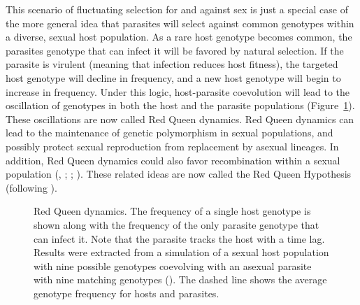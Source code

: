 \documentclass[
  letterpaper,
]{book}
\begin{document}
This scenario of fluctuating selection for and against sex is just a
special case of the more general idea that parasites will select against
common genotypes within a diverse, sexual host population. As a rare
host genotype becomes common, the parasites genotype that can infect it
will be favored by natural selection. If the parasite is virulent
(meaning that infection reduces host fitness), the targeted host
genotype will decline in frequency, and a new host genotype will begin
to increase in frequency. Under this logic, host-parasite coevolution
will lead to the oscillation of genotypes in both the host and the
parasite populations (Figure~\ref{fig-2-4}). These oscillations are now
called Red Queen dynamics. Red Queen dynamics can lead to the
maintenance of genetic polymorphism in sexual populations, and possibly
protect sexual reproduction from replacement by asexual lineages. In
addition, Red Queen dynamics could also favor recombination within a
sexual population (,
; ; ). These related ideas are now called the Red Queen
Hypothesis (following ).

\begin{figure}


\caption[Red Queen dynamics]{\label{fig-2-4}Red Queen dynamics. The
frequency of a single host genotype is shown along with the frequency of
the only parasite genotype that can infect it. Note that the parasite
tracks the host with a time lag. Results were extracted from a
simulation of a sexual host population with nine possible genotypes
coevolving with an asexual parasite with nine matching genotypes
(). The dashed line shows the
average genotype frequency for hosts and parasites.}

\end{figure}%
\end{document}
